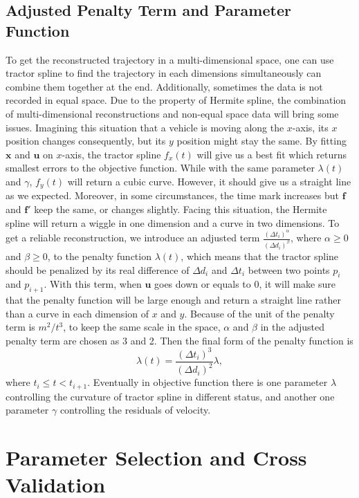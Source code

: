 \subsection{Adjusted Penalty Term and Parameter Function}
To get the reconstructed trajectory in a multi-dimensional space, one can use tractor spline to find the trajectory in each dimensions simultaneously can combine them together at the end. Additionally, sometimes the data is not recorded in equal space. Due to the property of Hermite spline, the combination of multi-dimensional reconstructions and non-equal space data will bring some issues. Imagining this situation that a vehicle is moving along the $x$-axis, its $x$ position changes consequently, but its $y$ position might stay the same. By fitting $\mathbf{x}$ and $\mathbf{u}$ on $x$-axis, the tractor spline $f_x(t)$ will give us a best fit which returns smallest errors to the objective function. While with the same parameter $\lambda(t)$ and $\gamma$, $f_y(t)$ will return a cubic curve. However, it should give us a straight line as we expected. Moreover, in some circumstances, the time mark increases but $\mathbf{f}$ and $\mathbf{f}'$ keep the same, or changes slightly. Facing this situation, the Hermite spline will return a wiggle in one dimension and a curve in two dimensions. To get a reliable reconstruction, we introduce an adjusted term $\frac{(\Delta t_i)^\alpha}{(\Delta d_i)^\beta}$, where $\alpha \ge 0$ and $\beta \ge 0$, to the penalty function $\lambda(t)$, which means that the tractor spline should be penalized by its real difference of $\Delta d_i$ and $\Delta t_i$ between two points $p_i$ and $p_{i+1}$. With this term, when $\mathbf{u}$ goes down or equals to 0, it will make sure that the penalty function will be large enough and return a straight line rather than a curve in each dimension of $x$ and $y$. Because of the unit of the penalty term is $m^2/t^3$, to keep the same scale in the space, $\alpha$ and $\beta$ in the adjusted penalty term are chosen as 3 and 2. Then the final form of the penalty function is
\begin{equation}\label{adjustedpenalty}
\lambda(t)=\frac{(\Delta t_i)^3}{(\Delta d_i)^2}\lambda,
\end{equation}
where  $t_i\leq t < t_{i+1}$. Eventually in objective function there is one parameter $\lambda$ controlling the curvature of tractor spline in different status, and another one parameter $\gamma$ controlling the residuals of velocity. 

\section{Parameter Selection and Cross Validation}

